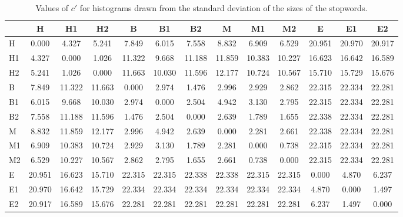 \begin{table*}[h!]
\begin{center}
\begin{tabular}{| l | c | c | c | c | c | c | c | c | c | c | c | c |}\hline
 & H & H1 & H2 & B & B1 & B2 & M & M1 & M2 & E & E1 & E2 \\\hline
H & 0.000  & 4.327  & 5.241  & 7.849  & 6.015  & 7.558  & 8.832  & 6.909  & 6.529  & 20.951  & 20.970  & 20.917 \\\hline
H1 & 4.327  & 0.000  & 1.026  & 11.322  & 9.668  & 11.188  & 11.859  & 10.383  & 10.227  & 16.623  & 16.642  & 16.589 \\\hline
H2 & 5.241  & 1.026  & 0.000  & 11.663  & 10.030  & 11.596  & 12.177  & 10.724  & 10.567  & 15.710  & 15.729  & 15.676 \\\hline
B & 7.849  & 11.322  & 11.663  & 0.000  & 2.974  & 1.476  & 2.996  & 2.929  & 2.862  & 22.315  & 22.334  & 22.281 \\\hline
B1 & 6.015  & 9.668  & 10.030  & 2.974  & 0.000  & 2.504  & 4.942  & 3.130  & 2.795  & 22.315  & 22.334  & 22.281 \\\hline
B2 & 7.558  & 11.188  & 11.596  & 1.476  & 2.504  & 0.000  & 2.639  & 1.789  & 1.655  & 22.338  & 22.334  & 22.281 \\\hline
M & 8.832  & 11.859  & 12.177  & 2.996  & 4.942  & 2.639  & 0.000  & 2.281  & 2.661  & 22.338  & 22.334  & 22.281 \\\hline
M1 & 6.909  & 10.383  & 10.724  & 2.929  & 3.130  & 1.789  & 2.281  & 0.000  & 0.738  & 22.315  & 22.334  & 22.281 \\\hline
M2 & 6.529  & 10.227  & 10.567  & 2.862  & 2.795  & 1.655  & 2.661  & 0.738  & 0.000  & 22.315  & 22.334  & 22.281 \\\hline
E & 20.951  & 16.623  & 15.710  & 22.315  & 22.315  & 22.338  & 22.338  & 22.315  & 22.315  & 0.000  & 4.870  & 6.237 \\\hline
E1 & 20.970  & 16.642  & 15.729  & 22.334  & 22.334  & 22.334  & 22.334  & 22.334  & 22.334  & 4.870  & 0.000  & 1.497 \\\hline
E2 & 20.917  & 16.589  & 15.676  & 22.281  & 22.281  & 22.281  & 22.281  & 22.281  & 22.281  & 6.237  & 1.497  & 0.000 \\\hline
\end{tabular}
\caption{Values of $c'$ for histograms drawn from the standard deviation of the sizes of the stopwords.}
\end{center}
\end{table*}